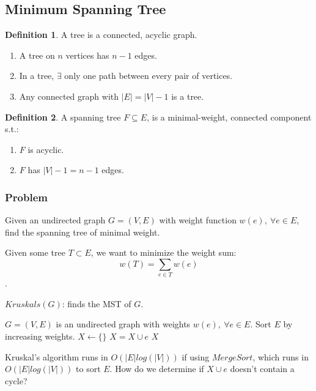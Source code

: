 \documentclass{article}
\theoremstyle{definition}
\newtheorem{definition}{Definition}[section]
\begin{document}
\subsection{Minimum Spanning Tree}
\begin{definition}
	A tree is a connected, acyclic graph.
	\begin{enumerate}
		\item A tree on $n$ vertices has $n-1$ edges.
		\item In a tree, $\exists$ only one path between every pair of vertices.
		\item Any connected graph with $|E|=|V|-1$ is a tree.
	\end{enumerate}
\end{definition}

\begin{definition}
A spanning tree $F \subseteq E$, is a minimal-weight, connected component s.t.:
\begin{enumerate}
	\item $F$ is acyclic. 
	\item $F$ has $|V|-1=n-1$ edges.
\end{enumerate}
\end{definition}

\subsubsection{Problem}
Given an undirected graph $G = (V,E)$ with weight function $w(e),\: \forall e \in E$, find the spanning tree of minimal weight. 

Given some tree $T \subset E$, we want to minimize the weight sum: $$w(T) = \sum_{e \in T}w(e)$$.

\begin{algorithm}
	\caption{$Kruskals(G)$: finds the MST of $G$.}
	\label{alg:kruskals}
	\begin{algorithmic}[1]
		\REQUIRE $G=(V,E)$ is an undirected graph with weights $w(e), \: \forall e \in E$.
		\STATE Sort $E$ by increasing weights. 
		\STATE $X \gets \{\}$
			\STATE $X = X \cup e$
		\ENDIF
		\ENDFOR
		\RETURN $X$
	\end{algorithmic}
\end{algorithm}

Kruskal's algorithm runs in $O(|E|log(|V|))$ if using $MergeSort$, which runs in $O(|E|log(|V|))$ to sort $E$. How do we determine if $X \cup e$ doesn't contain a cycle? 
\end{document}

